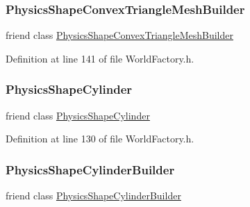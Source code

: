 \subsubsection{\texorpdfstring{Physics\+Shape\+Convex\+Triangle\+Mesh\+Builder}{PhysicsShapeConvexTriangleMeshBuilder}}
{\footnotesize\ttfamily friend class \mbox{\hyperlink{classnjli_1_1_physics_shape_convex_triangle_mesh_builder}{Physics\+Shape\+Convex\+Triangle\+Mesh\+Builder}}\hspace{0.3cm}{\ttfamily [friend]}}



Definition at line 141 of file World\+Factory.\+h.

\mbox{\label{classnjli_1_1_world_factory_aa2e59a26c135fb52f13d19f1f09b6880}} 
\subsubsection{\texorpdfstring{Physics\+Shape\+Cylinder}{PhysicsShapeCylinder}}
{\footnotesize\ttfamily friend class \mbox{\hyperlink{classnjli_1_1_physics_shape_cylinder}{Physics\+Shape\+Cylinder}}\hspace{0.3cm}{\ttfamily [friend]}}



Definition at line 130 of file World\+Factory.\+h.

\mbox{\label{classnjli_1_1_world_factory_a1df6e91827326ced519104ee8edcafb8}} 
\subsubsection{\texorpdfstring{Physics\+Shape\+Cylinder\+Builder}{PhysicsShapeCylinderBuilder}}
{\footnotesize\ttfamily friend class \mbox{\hyperlink{classnjli_1_1_physics_shape_cylinder_builder}{Physics\+Shape\+Cylinder\+Builder}}\hspace{0.3cm}{\ttfamily [friend]}}



